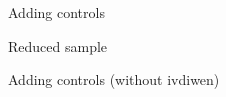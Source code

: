 \documentclass{beamer}
\begin{document}

\begin{frame}{Adding controls}
\centering


\end{frame}




\begin{frame}{Reduced sample}
\centering
\resizebox{0.9\linewidth}{!}{

}
\end{frame}


\begin{frame}{Adding controls (without ivdiwen)}
\centering
\resizebox{0.9\linewidth}{!}{

}

\end{frame}

\end{document}
